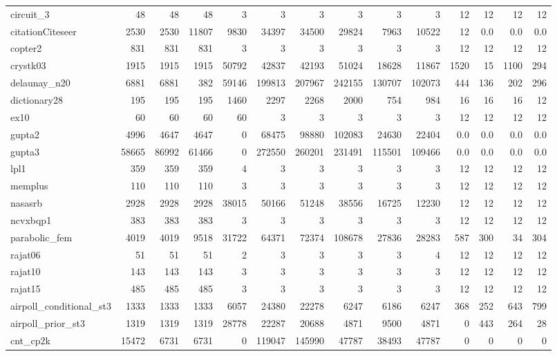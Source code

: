 \begin{sidewaystable}
{\begin{tabular}{ l r r r r r r r r r r r r r }
      circuit\_3 & 48 & 48 & 48 & 3 & 3 & 3 & 3 & 3 & 3 & 12 & 12 & 12 & 12 \\
      citationCiteseer & 2530 & 2530 & 11807 & 9830 & 34397 & 34500 & 29824 & 7963 & 10522 & 12 & 0.0 & 0.0 & 0.0 \\
      copter2 & 831 & 831 & 831 & 3 & 3 & 3 & 3 & 3 & 3 & 12 & 12 & 12 & 12 \\
      crystk03 & 1915 & 1915 & 1915 & 50792 & 42837 & 42193 & 51024 & 18628 & 11867 & 1520 & 15 & 1100 & 294 \\
      delaunay\_n20 & 6881 & 6881 & 382 & 59146 & 199813 & 207967 & 242155 & 130707 & 102073 & 444 & 136 & 202 & 296 \\
      dictionary28 & 195 & 195 & 195 & 1460 & 2297 & 2268 & 2000 & 754 & 984 & 16 & 16 & 16 & 12 \\
      ex10 & 60 & 60 & 60 & 60 & 3 & 3 & 3 & 3 & 3 & 12 & 12 & 12 & 12 \\
      gupta2 & 4996 & 4647 & 4647 & 0 & 68475 & 98880 & 102083 & 24630 & 22404 & 0.0 & 0.0 & 0.0 & 0.0 \\
      gupta3 & 58665 & 86992 & 61466 & 0 & 272550 & 260201 & 231491 & 115501 & 109466 & 0.0 & 0.0 & 0.0 & 0.0 \\
      lpl1 & 359 & 359 & 359 & 4 & 3 & 3 & 3 & 3 & 3 & 12 & 12 & 12 & 12 \\
      memplus & 110 & 110 & 110 & 3 & 3 & 3 & 3 & 3 & 3 & 12 & 12 & 12 & 12 \\
      nasasrb & 2928 & 2928 & 2928 & 38015 & 50166 & 51248 & 38556 & 16725 & 12230 & 12 & 12 & 12 & 12 \\
      ncvxbqp1 & 383 & 383 & 383 & 3 & 3 & 3 & 3 & 3 & 3 & 12 & 12 & 12 & 12 \\
      parabolic\_fem & 4019 & 4019 & 9518 & 31722 & 64371 & 72374 & 108678 & 27836 & 28283 & 587 & 300 & 34 & 304 \\
      rajat06 & 51 & 51 & 51 & 2 & 3 & 3 & 3 & 3 & 4 & 12 & 12 & 12 & 12 \\
      rajat10 & 143 & 143 & 143 & 3 & 3 & 3 & 3 & 3 & 3 & 12 & 12 & 12 & 12 \\
      rajat15 & 485 & 485 & 485 & 3 & 3 & 3 & 3 & 3 & 3 & 12 & 12 & 12 & 12 \\
      airpoll\_conditional\_st3 & 1333 & 1333 & 1333 & 6057 & 24380 & 22278 & 6247 & 6186 & 6247 & 368 & 252 & 643 & 799 \\
      airpoll\_prior\_st3 & 1319 & 1319 & 1319 & 28778 & 22287 & 20688 & 4871 & 9500 & 4871 & 0 & 443 & 264 & 28 \\
      cnt\_cp2k & 15472 & 6731 & 6731 & 0 & 119047 & 145990 & 47787 & 38493 & 47787 & 0 & 0 & 0 & 0 \\

\end{tabular}}
\end{sidewaystable}
